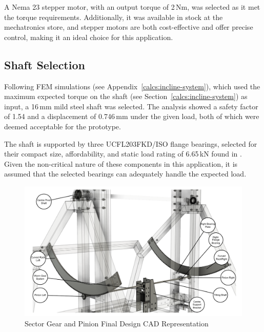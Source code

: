 A Nema 23 stepper motor, with an output torque of 2\,Nm, was selected as it met the torque requirements. Additionally, it was available in stock at the mechatronics store, and stepper motors are both cost-effective and offer precise control, making it an ideal choice for this application.

\subsection{Shaft Selection}
Following FEM simulations (see Appendix~\ref{calcs:incline-system}), which used the maximum expected torque on the shaft (see Section~\ref{calcs:incline-system}) as input, a 16\,mm mild steel shaft was selected. The analysis showed a safety factor of 1.54 and a displacement of 0.746\,mm under the given load, both of which were deemed acceptable for the prototype.

The shaft is supported by three UCFL203FKD/ISO flange bearings, selected for their compact size, affordability, and static load rating of 6.65\,kN found in \cite{ntn_bearings2024}. Given the non-critical nature of these components in this application, it is assumed that the selected bearings can adequately handle the expected load.

\begin{figure}[H]
    \centering
    \includegraphics[width=1\linewidth]{figs/final_design/Incline_subsystem_CAD-1.pdf}
    \caption{Sector Gear and Pinion Final Design CAD Representation}
    \label{fig:sector-gear-pinion-cad}
\end{figure}

